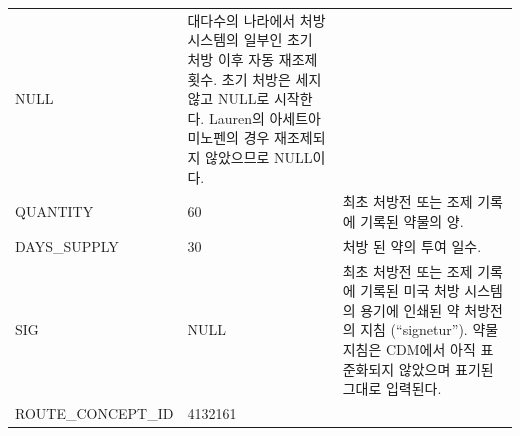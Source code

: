 \documentclass[11pt]{book}
\theoremstyle{definition}
\theoremstyle{definition}
\theoremstyle{definition}
\theoremstyle{remark}
\begin{document}
\begin{longtable}[]{@{}lll@{}}
\begin{minipage}[t]{0.16\columnwidth}
NULL\strut
\end{minipage} & \begin{minipage}[t]{0.48\columnwidth}\raggedright\strut
대다수의 나라에서 처방 시스템의 일부인 초기 처방 이후 자동 재조제 횟수.
초기 처방은 세지 않고 NULL로 시작한다. Lauren의 아세트아미노펜의 경우
재조제되지 않았으므로 NULL이다.\strut
\end{minipage}\tabularnewline
\begin{minipage}[t]{0.28\columnwidth}\raggedright\strut
QUANTITY\strut
\end{minipage} & \begin{minipage}[t]{0.16\columnwidth}\raggedright\strut
60\strut
\end{minipage} & \begin{minipage}[t]{0.48\columnwidth}\raggedright\strut
최초 처방전 또는 조제 기록에 기록된 약물의 양.\strut
\end{minipage}\tabularnewline
\begin{minipage}[t]{0.28\columnwidth}\raggedright\strut
DAYS\_SUPPLY\strut
\end{minipage} & \begin{minipage}[t]{0.16\columnwidth}\raggedright\strut
30\strut
\end{minipage} & \begin{minipage}[t]{0.48\columnwidth}\raggedright\strut
처방 된 약의 투여 일수.\strut
\end{minipage}\tabularnewline
\begin{minipage}[t]{0.28\columnwidth}\raggedright\strut
SIG\strut
\end{minipage} & \begin{minipage}[t]{0.16\columnwidth}\raggedright\strut
NULL\strut
\end{minipage} & \begin{minipage}[t]{0.48\columnwidth}\raggedright\strut
최초 처방전 또는 조제 기록에 기록된 미국 처방 시스템의 용기에 인쇄된 약
처방전의 지침 (``signetur''). 약물 지침은 CDM에서 아직 표준화되지
않았으며 표기된 그대로 입력된다.\strut
\end{minipage}\tabularnewline
\begin{minipage}[t]{0.28\columnwidth}\raggedright\strut
ROUTE\_CONCEPT\_ID\strut
\end{minipage} & \begin{minipage}[t]{0.16\columnwidth}\raggedright\strut
4132161\strut
\end{minipage} & \begin{minipage}[t]{0.48\columnwidth}\raggedright\strut

\end{minipage}
\end{longtable}
\end{document}
